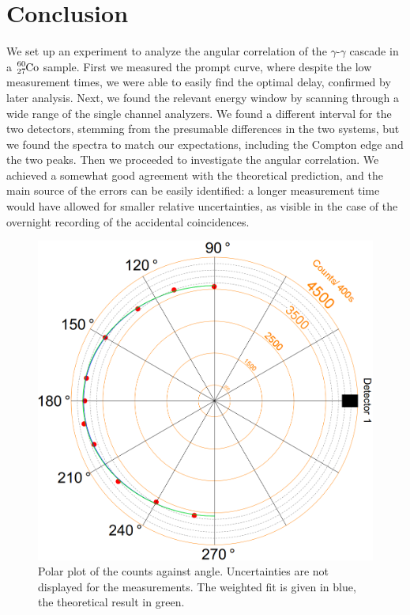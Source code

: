 \documentclass[twocolumn]{article}
\begin{document}
\section{Conclusion}
We set up an experiment to analyze the angular correlation of the $\gamma$-$\gamma$ cascade in a $\ce{_27^{60}Co}$ sample. First we measured the prompt curve, where despite the low measurement times, we were able to easily find the optimal delay, confirmed by later analysis. Next, we found the relevant energy window by scanning through a wide range of the single channel analyzers. We found a different interval for the two detectors, stemming from the presumable differences in the two systems, but we found the spectra to match our expectations, including the Compton edge and the two peaks. Then we proceeded to investigate the angular correlation. We achieved a somewhat good agreement with the theoretical prediction, and the main source of the errors can be easily identified: a longer measurement time would have allowed for smaller relative uncertainties, as visible in the case of the overnight recording of the accidental coincidences.
\begin{figure}
	\centering
	\includegraphics[width=\linewidth]{polar2.png}
	\caption{Polar plot of the counts against angle. Uncertainties are not displayed for the measurements. The weighted fit is given in blue, the theoretical result in green.}
	\label{fig:polar}
\end{figure}
\end{document}
